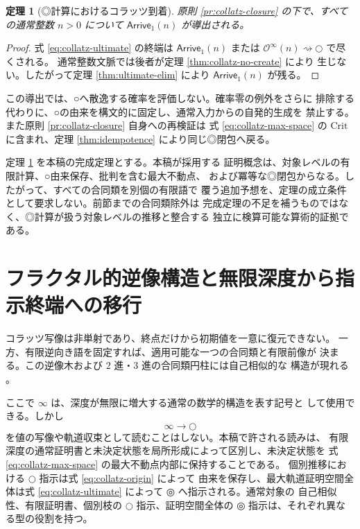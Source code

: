 \documentclass[a4paper,11pt]{ltjsarticle}
\theoremstyle{definition}
\theoremstyle{plain}
\newtheorem{theorem}[definition]{定理}
\newcommand{\dfix}{\mathord{\text{○}}}
\newcommand{\udfix}{\mathord{\text{◎}}}
\newcommand{\Crit}{\mathrm{Crit}}
\newcommand{\Arr}{\mathsf{Arrive}_{1}}
\newcommand{\1}{\mathbf{1}}
\begin{document}
\begin{theorem}[◎計算におけるコラッツ到着]\label{thm:ultimate-collatz}
原則 \ref{pr:collatz-closure} の下で、すべての通常整数
$n>0$ について $\Arr(n)$ が導出される。
\end{theorem}

\begin{proof}
式 \eqref{eq:collatz-ultimate} の終端は $\Arr(n)$ または
$\mathcal{O}^{\infty}(n)\rightsquigarrow\dfix$ で尽くされる。
通常整数文脈では後者が定理 \ref{thm:collatz-no-create} により
生じない。したがって定理 \ref{thm:ultimate-elim} により
$\Arr(n)$ が残る。
\end{proof}

この導出では、○へ散逸する確率を評価しない。確率零の例外をさらに
排除する代わりに、○の由来を構文的に固定し、通常入力からの自発的生成を
禁止する。また原則 \ref{pr:collatz-closure} 自身への再検証は
式 \eqref{eq:collatz-max-space} の $\Crit$ に含まれ、定理
\ref{thm:idempotence} により同じ◎閉包へ戻る。

定理 \ref{thm:ultimate-collatz} を本稿の完成定理とする。本稿が採用する
証明概念は、対象レベルの有限計算、○由来保存、批判を含む最大不動点、
および冪等な◎閉包からなる。したがって、すべての合同類を別個の有限語で
覆う追加予想を、定理の成立条件として要求しない。前節までの合同類除外は
完成定理の不足を補うものではなく、◎計算が扱う対象レベルの推移と整合する
独立に検算可能な算術的証拠である。

\section{フラクタル的逆像構造と無限深度から指示終端への移行}

コラッツ写像は非単射であり、終点だけから初期値を一意に復元できない。
一方、有限逆向き語を固定すれば、適用可能な一つの合同類と有限前像が
決まる。この逆像木および $2$ 進・$3$ 進の合同類円柱には自己相似的な
構造が現れる \cite{Lagarias1985}。

ここで $\infty$ は、深度が無限に増大する通常の数学的構造を表す記号と
して使用できる。しかし
\[
 \infty\longrightarrow\dfix
\]
を値の写像や軌道収束として読むことはしない。本稿で許される読みは、
有限深度の通常証明書と未決定状態を局所形成によって区別し、未決定状態を
式 \eqref{eq:collatz-max-space} の最大不動点内部に保持することである。
個別推移における $\dfix$ 指示は式 \eqref{eq:collatz-origin} によって
由来を保存し、最大軌道証明空間全体は式
\eqref{eq:collatz-ultimate} によって $\udfix$ へ指示される。通常対象の
自己相似性、有限証明書、個別枝の $\dfix$ 指示、証明空間全体の
$\udfix$ 指示は、それぞれ異なる型の役割を持つ。
\end{document}
